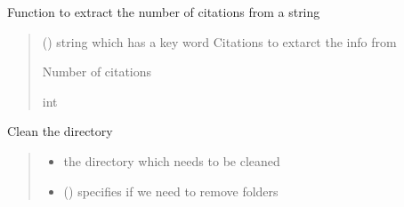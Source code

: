 \documentclass[letterpaper,10pt,english]{sphinxmanual}
\begin{document}
\begin{fulllineitems}
\label{\detokenize{auxilary_functions:auxilary_functions.citations}}
\pysigstartsignatures
{}
\pysigstopsignatures
\sphinxAtStartPar
Function to extract the number of citations from a string
\begin{quote}\begin{description}
\sphinxAtStartPar
{} () \textendash{} string which has a key word \sphinxhyphen{} Citations to extarct the info from

\sphinxAtStartPar
Number of citations

\sphinxAtStartPar
int

\end{description}\end{quote}

\end{fulllineitems}


\begin{fulllineitems}
\label{\detokenize{auxilary_functions:auxilary_functions.clean_directory}}
\pysigstartsignatures
{}
\pysigstopsignatures
\sphinxAtStartPar
Clean the directory
\begin{quote}\begin{description}
\begin{itemize}
\item {} 
\sphinxAtStartPar
{} \textendash{} the directory which needs to be cleaned

\item {} 
\sphinxAtStartPar
{} () \textendash{} specifies if we need to remove folders

\end{itemize}

\end{description}\end{quote}

\end{fulllineitems}
\end{document}
